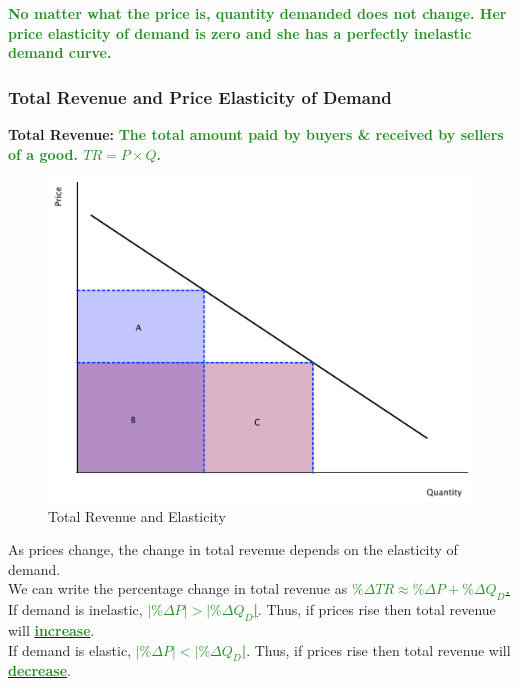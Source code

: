\documentclass[11pt]{article}\usepackage[]{graphicx}\usepackage[]{color}
\theoremstyle{definition}
\newcommand{\blank}[1]{}
\newcommand{\ddp}[1]{{\textbf{\textcolor{ForestGreen}{#1}}}}
\newcommand{\dd}[1]{{\underline{\textbf{\textcolor{ForestGreen}{#1}}}}}
\newcommand{\defn}[1]{\textbf{#1}}
\begin{document}
	\blank{}
	
	\ddp{No matter what the price is, quantity demanded does not change. Her price elasticity of demand is zero and she has a perfectly inelastic demand curve.}
	
	\subsubsection*{Total Revenue and Price Elasticity of Demand}
	
	
	\defn{Total Revenue:} \ddp{The total amount paid by buyers \& received by sellers of a good. $TR = P\times Q$.}

		\begin{figure}[H]
			\centering
			\includegraphics[scale=.38]{plot26.pdf}
			\caption{Total Revenue and Elasticity}
		\end{figure}
	

	As prices change, the change in total revenue depends on the elasticity of demand.
	\\
	
	We can write the percentage change in total revenue as \dd{$\%\Delta TR \approx \% \Delta P + \%\Delta Q_D$.}
	\\
	
	If demand is inelastic, \dd{$|\% \Delta P| > |\%\Delta Q_D$|}. Thus, if prices rise then total revenue will \dd{increase}.
	\\

	If demand is elastic, \dd{$|\% \Delta P| < |\%\Delta Q_D$|}. Thus, if prices rise then total revenue will \dd{decrease}.
	\\
	
\end{document}

